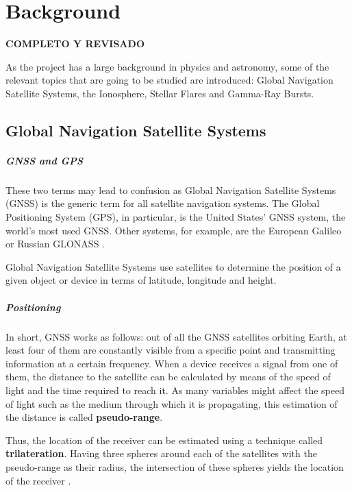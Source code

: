 \chapter{Background}

\textbf{COMPLETO Y REVISADO}

As the project has a large background in physics and astronomy, some of the relevant topics that are going to be studied are introduced: Global Navigation Satellite Systems, the Ionosphere, Stellar Flares and Gamma-Ray Bursts.

\section{Global Navigation Satellite Systems}

\paragraph{GNSS and GPS}

These two terms may lead to confusion as Global Navigation Satellite Systems (GNSS) is the generic term for all satellite navigation systems. The Global Positioning System (GPS), in particular, is the United States' GNSS system, the world's most used GNSS. Other systems, for example, are the European Galileo or Russian GLONASS \cite{hegarty2008evolution}.

Global Navigation Satellite Systems use satellites to determine the position of a given object or device in terms of latitude, longitude and height. 

\paragraph{Positioning}

In short, GNSS works as follows: out of all the GNSS satellites orbiting Earth, at least four of them are constantly visible from a specific point and transmitting information at a certain frequency. When a device receives a signal from one of them, the distance to the satellite can be calculated by means of the speed of light and the time required to reach it. As many variables might affect the speed of light such as the medium through which it is propagating, this estimation of the distance is called \textbf{pseudo-range}. 

Thus, the location of the receiver can be estimated using a technique called \textbf{trilateration}. Having three spheres around each of the satellites with the pseudo-range as their radius, the intersection of these spheres yields the location of the receiver \cite{hofmann2007gnss}. 

